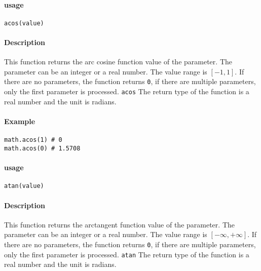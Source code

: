 
\paragraph{usage}
\begin{lstlisting}[language=berry, numbers=none]
acos(value)
\end{lstlisting}

\paragraph{Description}
This function returns the arc cosine function value of the parameter. The parameter can be an integer or a real number. The value range is $[-1,1]$. If there are no parameters, the function returns \texttt{0}, if there are multiple parameters, only the first parameter is processed. \texttt{acos} The return type of the function is a real number and the unit is radians.

\paragraph{Example}
\begin{lstlisting}[language=berry, numbers=none]
math.acos(1) # 0
math.acos(0) # 1.5708
\end{lstlisting}


\paragraph{usage}
\begin{lstlisting}[language=berry, numbers=none]
atan(value)
\end{lstlisting}

\paragraph{Description}
This function returns the arctangent function value of the parameter. The parameter can be an integer or a real number. The value range is $[-\infty,+\infty]$. If there are no parameters, the function returns \texttt{0}, if there are multiple parameters, only the first parameter is processed. \texttt{atan} The return type of the function is a real number and the unit is radians.

